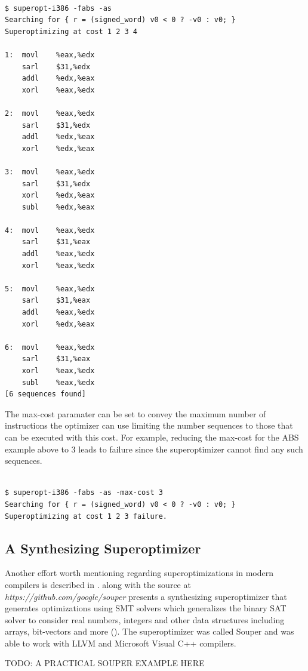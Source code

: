 \documentclass[sigconf]{acmart}
\begin{document}
\begin{verbatim}

$ superopt-i386 -fabs -as
Searching for { r = (signed_word) v0 < 0 ? -v0 : v0; }
Superoptimizing at cost 1 2 3 4

1:	movl	%eax,%edx
	sarl	$31,%edx
	addl	%edx,%eax
	xorl	%eax,%edx

2:	movl	%eax,%edx
	sarl	$31,%edx
	addl	%edx,%eax
	xorl	%edx,%eax

3:	movl	%eax,%edx
	sarl	$31,%edx
	xorl	%edx,%eax
	subl	%edx,%eax

4:	movl	%eax,%edx
	sarl	$31,%eax
	addl	%eax,%edx
	xorl	%eax,%edx

5:	movl	%eax,%edx
	sarl	$31,%eax
	addl	%eax,%edx
	xorl	%edx,%eax
	
6:	movl	%eax,%edx
	sarl	$31,%eax
	xorl	%eax,%edx
	subl	%eax,%edx
[6 sequences found]

\end{verbatim}

The max-cost paramater can be set to convey the maximum number of instructions the optimizer can use limiting the number sequences to those that can be executed with this cost. For example, reducing the max-cost for the ABS example above to 3 leads to failure since the superoptimizer cannot find any such sequences.

\begin{verbatim}

$ superopt-i386 -fabs -as -max-cost 3
Searching for { r = (signed_word) v0 < 0 ? -v0 : v0; }
Superoptimizing at cost 1 2 3 failure.

\end{verbatim}

\subsection{A Synthesizing Superoptimizer}

Another effort worth mentioning regarding superoptimizations in modern compilers is described in \cite{souper}. \cite{souper} along with the source at \textit{https://github.com/google/souper} presents a synthesizing superoptimizer that generates optimizations using SMT solvers which generalizes the binary SAT solver to consider real numbers, integers and other data structures including arrays, bit-vectors and more (\cite{SMT}). The superoptimizer was called Souper and was able to work with LLVM and Microsoft Visual C++ compilers.  

TODO: A PRACTICAL SOUPER EXAMPLE HERE
\end{document}
